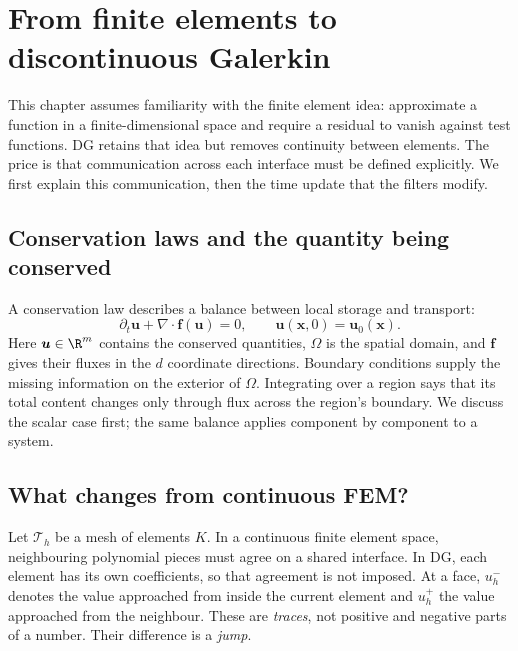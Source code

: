 \chapter{From finite elements to discontinuous Galerkin}
\label{chap:methods}

This chapter assumes familiarity with the finite element idea: approximate a
function in a finite-dimensional space and require a residual to vanish against
test functions. DG retains that idea but removes continuity between elements.
The price is that communication across each interface must be defined explicitly.
We first explain this communication, then the time update that the filters modify.

\section{Conservation laws and the quantity being conserved}
\label{sec:rkdg}
A conservation law describes a balance between local storage and transport:
\begin{equation}
 \partial_t\boldsymbol u+\nabla\cdot\boldsymbol f(\boldsymbol u)=0,
 \qquad \boldsymbol u(\boldsymbol x,0)=\boldsymbol u_0(\boldsymbol x).
 \label{eq:conservation-law}
\end{equation}
Here $\boldsymbol u\in\R^m$ contains the conserved quantities, $\Omega$ is the
spatial domain, and $\boldsymbol f$ gives their fluxes in the $d$ coordinate
directions. Boundary conditions supply the missing information on the exterior
of $\Omega$. Integrating over a region says that its total content changes only
through flux across the region's boundary. We discuss the scalar case first;
the same balance applies component by component to a system.

\section{What changes from continuous FEM?}
Let $\mathcal T_h$ be a mesh of elements $K$. In a continuous finite element
space, neighbouring polynomial pieces must agree on a shared interface. In DG,
each element has its own coefficients, so that agreement is not imposed. At a
face, $u_h^-$ denotes the value approached from inside the current element and
$u_h^+$ the value approached from the neighbour. These are \emph{traces}, not
positive and negative parts of a number. Their difference is a \emph{jump}.

